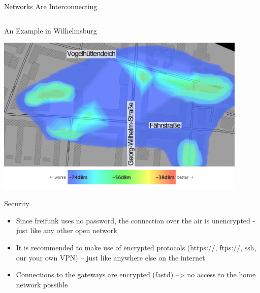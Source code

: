 \documentclass[c]{beamer}
\begin{document}
\begin{frame}{Networks Are Interconnecting}
\begin{columns}[c]
\begin{column}[r]{.5\textwidth}
{{}}
		\end{column}
	\end{columns}
\end{frame}


\begin{frame}{An Example in Wilhelmsburg}
	\begin{center}
		\includegraphics[width=0.9\textwidth]{wilhelmsburg}
	\end{center}
\end{frame}


\begin{frame}{Security}
	\begin{itemize}
		\item Since freifunk uses no password, the connection over the air is unencrypted - just like any other open network
		\item It is recommended to make use of encrypted protocols (https://, ftps://, ssh, our your own VPN) – just like anywhere else on the internet
		\item Connections to the gateways are encrypted (fastd) --> no access to the home network possible
	\end{itemize}
\end{frame}
\end{document}
